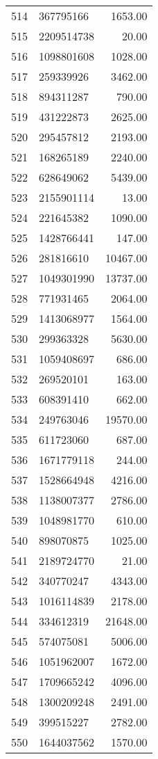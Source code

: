 \begin{table}[ht]
\begin{tabular}{rlr}
  514 & 367795166 & 1653.00 \\ 
  515 & 2209514738 & 20.00 \\ 
  516 & 1098801608 & 1028.00 \\ 
  517 & 259339926 & 3462.00 \\ 
  518 & 894311287 & 790.00 \\ 
  519 & 431222873 & 2625.00 \\ 
  520 & 295457812 & 2193.00 \\ 
  521 & 168265189 & 2240.00 \\ 
  522 & 628649062 & 5439.00 \\ 
  523 & 2155901114 & 13.00 \\ 
  524 & 221645382 & 1090.00 \\ 
  525 & 1428766441 & 147.00 \\ 
  526 & 281816610 & 10467.00 \\ 
  527 & 1049301990 & 13737.00 \\ 
  528 & 771931465 & 2064.00 \\ 
  529 & 1413068977 & 1564.00 \\ 
  530 & 299363328 & 5630.00 \\ 
  531 & 1059408697 & 686.00 \\ 
  532 & 269520101 & 163.00 \\ 
  533 & 608391410 & 662.00 \\ 
  534 & 249763046 & 19570.00 \\ 
  535 & 611723060 & 687.00 \\ 
  536 & 1671779118 & 244.00 \\ 
  537 & 1528664948 & 4216.00 \\ 
  538 & 1138007377 & 2786.00 \\ 
  539 & 1048981770 & 610.00 \\ 
  540 & 898070875 & 1025.00 \\ 
  541 & 2189724770 & 21.00 \\ 
  542 & 340770247 & 4343.00 \\ 
  543 & 1016114839 & 2178.00 \\ 
  544 & 334612319 & 21648.00 \\ 
  545 & 574075081 & 5006.00 \\ 
  546 & 1051962007 & 1672.00 \\ 
  547 & 1709665242 & 4096.00 \\ 
  548 & 1300209248 & 2491.00 \\ 
  549 & 399515227 & 2782.00 \\ 
  550 & 1644037562 & 1570.00 \\ 

\end{tabular}
\end{table}
